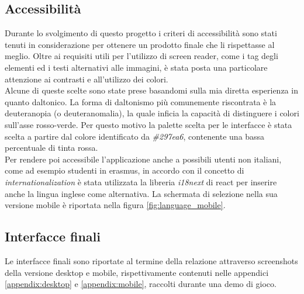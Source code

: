 \newpage

\subsection{Accessibilità}
Durante lo svolgimento di questo progetto i criteri di accessibilità sono stati tenuti in considerazione per ottenere un prodotto finale che li rispettasse al meglio. 
Oltre ai requisiti utili per l'utilizzo di screen reader, come i tag degli elementi ed i testi alternativi alle immagini, è stata posta una particolare attenzione ai contrasti e all'utilizzo dei colori.\\
Alcune di queste scelte sono state prese basandomi sulla mia diretta esperienza in quanto daltonico. La forma di daltonismo più comunemente riscontrata è la deuteranopia (o deuteranomalia), la quale inficia la capacità di distinguere i colori sull'asse rosso-verde. Per questo motivo la palette scelta per le interfacce è stata scelta a partire dal colore identificato da \emph{\#297ea6}, contenente una bassa percentuale di tinta rossa.\\
Per rendere poi accessibile l'applicazione anche a possibili utenti non italiani, come ad esempio studenti in erasmus, in accordo con il concetto di \emph{internationalization} \cite{internationalizationWikipedia} è stata utilizzata la libreria \emph{i18next} \cite{i18next} di react per inserire anche la lingua inglese come alternativa. La schermata di selezione nella sua versione mobile è riportata nella figura \ref{fig:language_mobile}.

\subsection{Interfacce finali}
Le interfacce finali sono riportate al termine della relazione attraverso screenshots della versione desktop e mobile, rispettivamente contenuti nelle appendici \ref{appendix:desktop} e \ref{appendix:mobile}, raccolti durante una demo di gioco.\\

